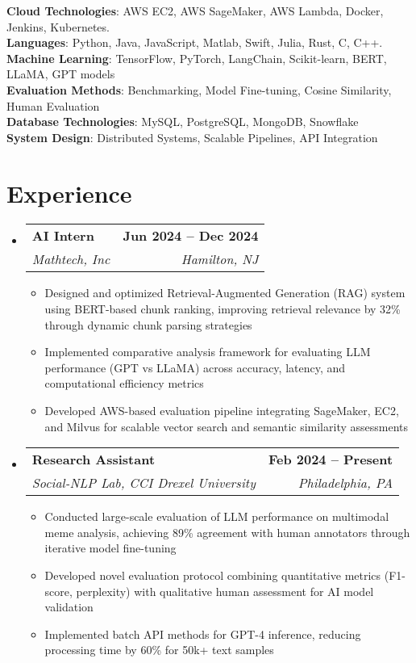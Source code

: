 \documentclass[letterpaper,11pt]{article}
\makeatletter
\newcommand{\resumeItem}[1]{
  \item\small{
    {#1 \vspace{-2pt}}
  }
}
\newcommand{\resumeSubheading}[4]{
  \vspace{-2pt}\item
    \begin{tabular*}{1.0\textwidth}[t]{l@{\extracolsep{\fill}}r}
      \textbf{#1} & \textbf{\small #2} \\
      \textit{\small#3} & \textit{\small #4} \\
    \end{tabular*}\vspace{-7pt}
}
\newcommand{\resumeSubHeadingListStart}{\begin{itemize}[leftmargin=0.0in, label={}]}
\newcommand{\resumeSubHeadingListEnd}{\end{itemize}}
\newcommand{\resumeItemListStart}{\begin{itemize}}
\newcommand{\resumeItemListEnd}{\end{itemize}\vspace{-5pt}}
\makeatother
\begin{document}
\begin{itemize}[leftmargin=0.15in, label={}]
	\small{\item{
		\textbf{Cloud Technologies}{: AWS EC2, AWS SageMaker, AWS Lambda, Docker, Jenkins, Kubernetes.} \\
		\textbf{Languages}{: Python, Java, JavaScript, Matlab, Swift, Julia, Rust, C, C++.} \\
		\textbf{Machine Learning}{: TensorFlow, PyTorch, LangChain, Scikit-learn, BERT, LLaMA, GPT models} \\
		\textbf{Evaluation Methods}{: Benchmarking, Model Fine-tuning, Cosine Similarity, Human Evaluation} \\
		\textbf{Database Technologies}{: MySQL, PostgreSQL, MongoDB, Snowflake}\\
            \textbf{System Design}{: Distributed Systems, Scalable Pipelines, API Integration}}
	}
\end{itemize}
\vspace{-22pt}

\section{Experience}
  \resumeSubHeadingListStart
    \resumeSubheading
    {AI Intern}{Jun 2024 -- Dec 2024}
    {Mathtech, Inc}{Hamilton, NJ}
    \resumeItemListStart
        \resumeItem{Designed and optimized Retrieval-Augmented Generation (RAG) system using BERT-based chunk ranking, improving retrieval relevance by 32\% through dynamic chunk parsing strategies}
        \resumeItem{Implemented comparative analysis framework for evaluating LLM performance (GPT vs LLaMA) across accuracy, latency, and computational efficiency metrics}
        \resumeItem{Developed AWS-based evaluation pipeline integrating SageMaker, EC2, and Milvus for scalable vector search and semantic similarity assessments}
    \resumeItemListEnd
    \vspace{-5pt}
    \resumeSubheading
    {Research Assistant}{Feb 2024 -- Present}
    {Social-NLP Lab, CCI Drexel University}{Philadelphia, PA}
    \resumeItemListStart
        \resumeItem{Conducted large-scale evaluation of LLM performance on multimodal meme analysis, achieving 89\% agreement with human annotators through iterative model fine-tuning}
        \resumeItem{Developed novel evaluation protocol combining quantitative metrics (F1-score, perplexity) with qualitative human assessment for AI model validation}
        \resumeItem{Implemented batch API methods for GPT-4 inference, reducing processing time by 60\% for 50k+ text samples}
    \resumeItemListEnd
\resumeSubHeadingListEnd
\vspace{-20pt}
\end{document}
